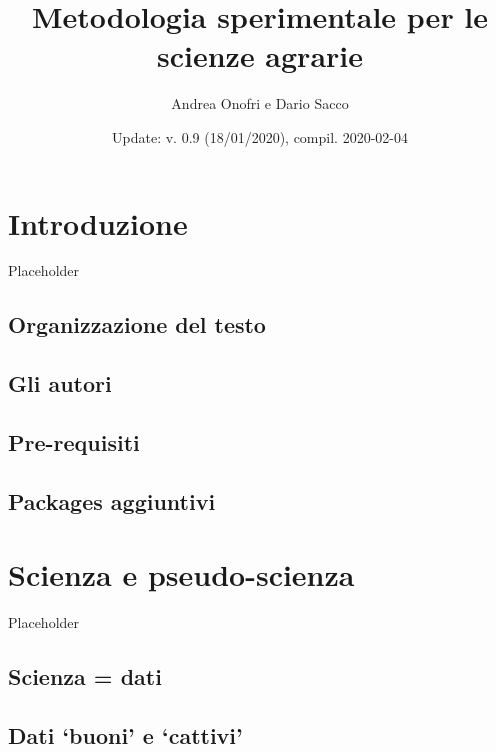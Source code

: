 \documentclass[a4paper,12pt,oneside]{book}
\author{Andrea Onofri e Dario Sacco}
\date{Update: v. 0.9 (18/01/2020), compil. 2020-02-04}
\title{Metodologia sperimentale per le scienze agrarie}
\subtitle{}
\begin{document}
\maketitle
\tableofcontents

\hypertarget{introduzione}{%
\chapter*{Introduzione}\label{introduzione}}

Placeholder

\hypertarget{organizzazione-del-testo}{%
\section*{Organizzazione del testo}\label{organizzazione-del-testo}}

\hypertarget{gli-autori}{%
\section*{Gli autori}\label{gli-autori}}

\hypertarget{pre-requisiti}{%
\section*{Pre-requisiti}\label{pre-requisiti}}

\hypertarget{packages-aggiuntivi}{%
\section*{Packages aggiuntivi}\label{packages-aggiuntivi}}

\hypertarget{scienza-e-pseudo-scienza}{%
\chapter{Scienza e pseudo-scienza}\label{scienza-e-pseudo-scienza}}

Placeholder

\hypertarget{scienza-dati}{%
\section{Scienza = dati}\label{scienza-dati}}

\hypertarget{dati-buoni-e-cattivi}{%
\section{Dati `buoni' e `cattivi'}\label{dati-buoni-e-cattivi}}
\end{document}
